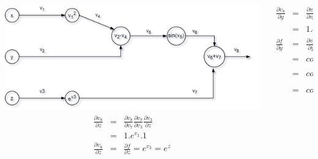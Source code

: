 \begin{frame}{}
	\begin{columns}[T]
		\begin{column}{.5\textwidth}
			\includegraphics[width=1.1\textwidth, center]{figuras/backprop_eg1.png}
			\begin{align*}
					\frac{\partial v_8}{\partial z}&=& 
					\frac{\partial v_8}{\partial v_7} 
					\frac{\partial v_7}{\partial v_3} 
					\frac{\partial v_3}{\partial z}  \\
					&=& 1.e^{v_3}.1 \\
					\frac{\partial v_8}{\partial z}&=&\frac{\partial f}{\partial z} 
					= e^{v_3}=e^z 
			\end{align*}
		\end{column}
		\begin{column}{.5\textwidth}
			\begin{align*}
			\frac{\partial v_8}{\partial y}&=& 
			\frac{\partial v_8}{\partial v_6} 
			\frac{\partial v_6}{\partial v_5} 
			\frac{\partial v_5}{\partial v_2}  
			\frac{\partial v_2}{\partial y}\\
			& =& 1.cos(v_5).v^4.1 \\
			\frac{\partial f}{\partial y}&=&\frac{\partial v_8}{\partial y}
			= cos(v_5)v^4 \\
			&=& cos(v_2v_4)v_4 \\
			&=&cos(v^2_1y)v^2_1 \\
			&=&cos(x^2y)x^2
			\end{align*}
		\end{column}
	\end{columns}
\end{frame}